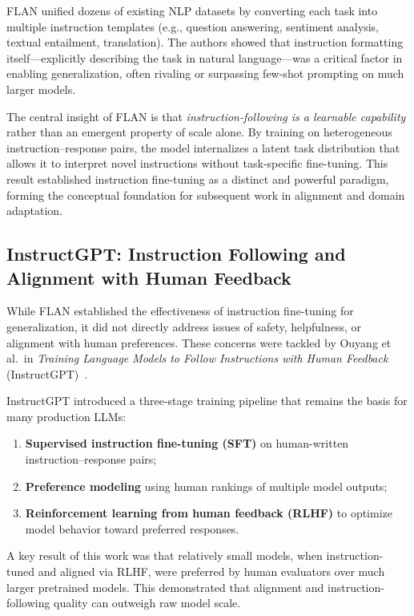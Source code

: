\documentclass[10pt]{article}
\begin{document}
FLAN unified dozens of existing NLP datasets by converting each task into multiple instruction templates (e.g., question answering, sentiment analysis, textual entailment, translation). The authors showed that instruction formatting itself—explicitly describing the task in natural language—was a critical factor in enabling generalization, often rivaling or surpassing few-shot prompting on much larger models.

The central insight of FLAN is that \emph{instruction-following is a learnable capability} rather than an emergent property of scale alone. By training on heterogeneous instruction–response pairs, the model internalizes a latent task distribution that allows it to interpret novel instructions without task-specific fine-tuning. This result established instruction fine-tuning as a distinct and powerful paradigm, forming the conceptual foundation for subsequent work in alignment and domain adaptation.

\subsection{InstructGPT: Instruction Following and Alignment with Human Feedback}

While FLAN established the effectiveness of instruction fine-tuning for generalization, it did not directly address issues of safety, helpfulness, or alignment with human preferences. These concerns were tackled by Ouyang et al.\ in \emph{Training Language Models to Follow Instructions with Human Feedback} (InstructGPT)~\cite{ouyang2022instructgpt}.

InstructGPT introduced a three-stage training pipeline that remains the basis for many production LLMs:
\begin{enumerate}[leftmargin=*]
  \item \textbf{Supervised instruction fine-tuning (SFT)} on human-written instruction–response pairs;
  \item \textbf{Preference modeling} using human rankings of multiple model outputs;
  \item \textbf{Reinforcement learning from human feedback (RLHF)} to optimize model behavior toward preferred responses.
\end{enumerate}

A key result of this work was that relatively small models, when instruction-tuned and aligned via RLHF, were preferred by human evaluators over much larger pretrained models. This demonstrated that alignment and instruction-following quality can outweigh raw model scale.
\end{document}

